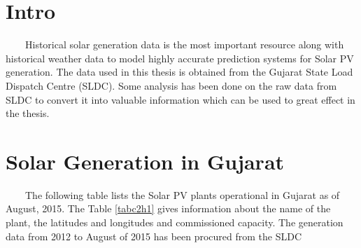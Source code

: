 
\section{Intro}
\
\
\
\
Historical solar generation data is the most important resource along with historical weather data to model highly accurate prediction systems for Solar PV generation. The data used in this thesis is obtained from the Gujarat State Load Dispatch Centre (SLDC). Some analysis has been done on the raw data from SLDC to convert it into valuable information which can be used to great effect in the thesis.

\section{Solar Generation in Gujarat}
\
\
\
\
The following table lists the Solar PV plants operational in Gujarat as of August, 2015. The Table \ref{tabc2h1} gives information about the name of the plant,  the latitudes and longitudes and commissioned capacity. The generation data from 2012 to August of 2015 has been procured from the SLDC
\\


